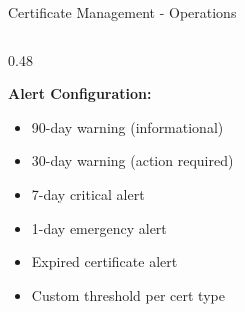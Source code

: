 \begin{frame}{Certificate Management - Operations}
\begin{columns}[T]
\begin{column}{0.48\textwidth}
      \vspace{0.1cm}

      \textbf{Alert Configuration:}
      \begin{itemize}
        \item 90-day warning (informational)
        \item 30-day warning (action required)
        \item 7-day critical alert
        \item 1-day emergency alert
        \item Expired certificate alert
        \item Custom threshold per cert type
      \end{itemize}
    \end{column}
  \end{columns}
\end{frame}
